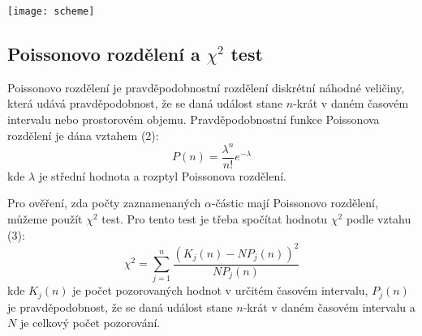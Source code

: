 \documentclass[a4paper,11pt]{article}
\begin{document}
    \hspace{10pt}
    \begin{minipage}[t]{0.5\textwidth} 
                \vspace{10pt}   
                \par \centering
                \texttt{[image: scheme]}
                \captionsetup{justification=centering, font=footnotesize}
                \label{fig:scheme}
                \vspace{10pt}
                \raggedright   

            \subsection{Poissonovo rozdělení a $\chi^2$ test}
                Poissonovo rozdělení je pravděpodobnostní rozdělení diskrétní náhodné veličiny, která udává pravděpodobnost, že se daná událost stane $n$-krát v daném časovém intervalu nebo prostorovém objemu. Pravděpodobnostní funkce Poissonova rozdělení je dána vztahem (2):
                \begin{equation}
                    P(n) = \frac{\lambda^n}{n!} e^{-\lambda}
                \end{equation}
                kde $\lambda$ je střední hodnota a rozptyl Poissonova rozdělení.
                \par Pro ověření, zda počty zaznamenaných $\alpha$-částic mají Poissonovo rozdělení, můžeme použít $\chi^2$ test. Pro tento test je třeba spočítat hodnotu $\chi^2$ podle vztahu (3):
                \begin{equation}
                    \chi^2 = \sum_{j=1}^{n} \frac{(K_j(n) - NP_j(n))^2}{NP_j(n)}
                \end{equation}
                kde $K_j(n)$ je počet pozorovaných hodnot v určitém časovém intervalu, $P_j(n)$ je pravděpodobnost, že se daná událost stane $n$-krát v daném časovém intervalu a $N$ je celkový počet pozorování.
    \end{minipage}
\newpage
\end{document}
